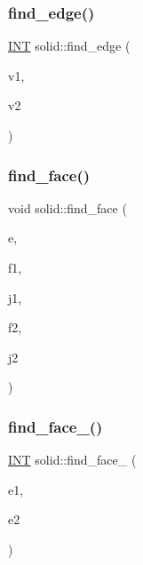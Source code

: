 \subsubsection{\texorpdfstring{find\+\_\+edge()}{find\_edge()}}
{\footnotesize\ttfamily \mbox{\hyperlink{galois_8h_a09fddde158a3a20bd2dcadb609de11dc}{I\+NT}} solid\+::find\+\_\+edge (\begin{DoxyParamCaption}\item[{\mbox{\hyperlink{galois_8h_a09fddde158a3a20bd2dcadb609de11dc}{I\+NT}}}]{v1,  }\item[{\mbox{\hyperlink{galois_8h_a09fddde158a3a20bd2dcadb609de11dc}{I\+NT}}}]{v2 }\end{DoxyParamCaption})}

\mbox{\label{classsolid_af71537b1f01c068f1d1517c523a72544}} 
\subsubsection{\texorpdfstring{find\+\_\+face()}{find\_face()}}
{\footnotesize\ttfamily void solid\+::find\+\_\+face (\begin{DoxyParamCaption}\item[{\mbox{\hyperlink{galois_8h_a09fddde158a3a20bd2dcadb609de11dc}{I\+NT}}}]{e,  }\item[{\mbox{\hyperlink{galois_8h_a09fddde158a3a20bd2dcadb609de11dc}{I\+NT}} \&}]{f1,  }\item[{\mbox{\hyperlink{galois_8h_a09fddde158a3a20bd2dcadb609de11dc}{I\+NT}} \&}]{j1,  }\item[{\mbox{\hyperlink{galois_8h_a09fddde158a3a20bd2dcadb609de11dc}{I\+NT}} \&}]{f2,  }\item[{\mbox{\hyperlink{galois_8h_a09fddde158a3a20bd2dcadb609de11dc}{I\+NT}} \&}]{j2 }\end{DoxyParamCaption})}

\mbox{\label{classsolid_af5173d277b17d5fe76c6dc39c3b863b7}} 
\subsubsection{\texorpdfstring{find\+\_\+face\+\_()}{find\_face\_2()}}
{\footnotesize\ttfamily \mbox{\hyperlink{galois_8h_a09fddde158a3a20bd2dcadb609de11dc}{I\+NT}} solid\+::find\+\_\+face\+\_ (\begin{DoxyParamCaption}\item[{\mbox{\hyperlink{galois_8h_a09fddde158a3a20bd2dcadb609de11dc}{I\+NT}}}]{e1,  }\item[{\mbox{\hyperlink{galois_8h_a09fddde158a3a20bd2dcadb609de11dc}{I\+NT}}}]{e2 }\end{DoxyParamCaption})}

